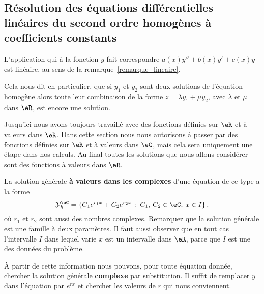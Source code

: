 \subsection{Résolution des équations différentielles linéaires du second ordre homogènes à coefficients constants}
\begin{remark}
 L'application qui à la fonction $y$ fait correspondre $a(x)y'' + b(x) y' + c(x)y$ est linéaire, au sens de la remarque~\ref{remarque_lineaire}.

Cela nous dit en particulier, que si $y_1$ et $y_2$ sont deux solutions de l'équation homogène alors toute leur combinaison de la forme $z = \lambda y_1 + \mu y_2$, avec $\lambda$ et $\mu$ dans $\eR$, est encore une solution.
 \end{remark}

\begin{framed}
  Jusqu'ici nous avons toujours travaillé avec des fonctions définies sur $\eR$ et à valeurs dans $\eR$. Dans cette section nous nous autorisons à passer par des fonctions définies sur $\eR$ et à valeurs dans $\eC$, mais cela sera uniquement une étape dans nos calculs. Au final toutes les solutions que nous allons considérer sont des fonctions à valeurs dans $\eR$.
\end{framed}

La solution générale \textbf{à valeurs dans les complexes} d'une équation de ce type a la forme
\begin{equation}\label{sol_gen_ordre_deux_hom}
  \mathcal{Y}_h^\eC  = \left\{C_1 e^{r_1x} +C_2 e^{r_2x} \,:\, C_1,\, C_2 \in \eC, \: x\in I \right\},
\end{equation}
où $r_1$ et $r_2$ sont aussi des nombres complexes. Remarquez que la solution générale est une famille à deux paramètres. Il faut aussi observer que en tout cas l'intervalle $I$ dans lequel varie $x$ est un intervalle dans $\eR$, parce que $I$ est une des données du problème.

À partir de cette information nous pouvons, pour toute équation donnée, chercher la solution générale \textbf{complexe} par substitution. Il suffit de remplacer $y$ dans l'équation par $e^{rx}$ et chercher les valeurs de $r$ qui nous conviennent.

